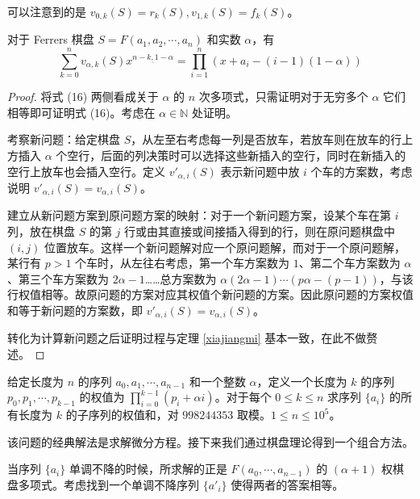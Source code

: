 \documentclass{noithesis}
\begin{document}
	可以注意到的是 $v_{0,k}(S) = r_k(S) , v_{1,k}(S) = f_k(S)$。
	
	\begin{theorem}\label{axiajiangmi}
		对于 Ferrers 棋盘 $S = F(a_1,a_2,\cdots,a_n)$ 和实数 $\alpha$，有\begin{equation}
		\sum_{k=0}^n v_{\alpha,k}(S)x^{\underline{n-k,1-\alpha}} = \prod_{i=1}^n (x+a_i-(i-1)(1-\alpha))
		\end{equation}
	\end{theorem}
	\begin{proof}
		将式 (16) 两侧看成关于 $\alpha$ 的 $n$ 次多项式，只需证明对于无穷多个 $\alpha$ 它们相等即可证明式 (16)。考虑在 $\alpha \in \mathbb{N}$ 处证明。
		
		考察新问题：给定棋盘 $S$，从左至右考虑每一列是否放车，若放车则在放车的行上方插入 $\alpha$ 个空行，后面的列决策时可以选择这些新插入的空行，同时在新插入的空行上放车也会插入空行。定义 $v'_{\alpha,i}(S)$ 表示新问题中放 $i$ 个车的方案数，考虑说明 $v'_{\alpha,i}(S) = v_{\alpha,i}(S)$。
		
		建立从新问题方案到原问题方案的映射：对于一个新问题方案，设某个车在第 $i$ 列，放在棋盘 $S$ 的第 $j$ 行或由其直接或间接插入得到的行，则在原问题棋盘中 $(i,j)$ 位置放车。这样一个新问题解对应一个原问题解，而对于一个原问题解，某行有 $p>1$ 个车时，从左往右考虑，第一个车方案数为 $1$、第二个车方案数为 $\alpha$、第三个车方案数为 $2\alpha-1$……总方案数为 $\alpha(2\alpha-1)\cdots(p\alpha-(p-1))$，与该行权值相等。故原问题的方案对应其权值个新问题的方案。因此原问题的方案权值和等于新问题的方案数，即 $v'_{\alpha,i}(S) = v_{\alpha,i}(S)$。
		
		转化为计算新问题之后证明过程与定理 \ref{xiajiangmi} 基本一致，在此不做赘述。
	\end{proof}
	
	\begin{problem}
		给定长度为 $n$ 的序列 $a_0,a_1,\cdots,a_{n-1}$ 和一个整数 $\alpha$，定义一个长度为 $k$ 的序列 $p_0,p_1,\cdots,p_{k-1}$ 的权值为 $\prod_{i=0}^{k-1}(p_i+\alpha i)$。对于每个 $0 \leq k \leq n$ 求序列 $\{a_i\}$ 的所有长度为 $k$ 的子序列的权值和，对 $998244353$ 取模。$1 \leq n \leq 10^5$。
	\end{problem}
	
	该问题的经典解法是求解微分方程。接下来我们通过棋盘理论得到一个组合方法。
	
	当序列 $\{a_i\}$ 单调不降的时候，所求解的正是 $F(a_0,\cdots,a_{n-1})$ 的 $(\alpha+1)$ 权棋盘多项式。考虑找到一个单调不降序列 $\{a'_i\}$ 使得两者的答案相等。
	
\end{document}
